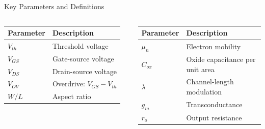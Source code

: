 \documentclass[10pt, aspectratio=169]{beamer}
\begin{document}
\begin{frame}{Key Parameters and Definitions}
    
    \begin{columns}[T]
    \begin{table}[t]
    \centering
    \renewcommand{\arraystretch}{1.8}
    \small
    \begin{tabular}{|l|p{4cm}|}
    \hline
    \textbf{Parameter} & \textbf{Description} \\
    \hline
    \hline
    $V_{th}$ & Threshold voltage \\
    \hline
    $V_{GS}$ & Gate-source voltage \\
    \hline
    $V_{DS}$ & Drain-source voltage \\
    \hline
    $V_{OV}$ & Overdrive: $V_{GS}-V_{th}$ \\
    \hline
    $W/L$ & Aspect ratio \\
    \hline
    \end{tabular}
    \end{table}
    
    \begin{table}[t]
    \centering
    \renewcommand{\arraystretch}{1.8}
    \small
    \begin{tabular}{|l|p{4cm}|}
    \hline
    \textbf{Parameter} & \textbf{Description} \\
    \hline
    \hline
    $\mu_n$ & Electron mobility \\
    \hline
    $C_{ox}$ & Oxide capacitance per unit area \\
    \hline
    $\lambda$ & Channel-length modulation \\
    \hline
    $g_m$ & Transconductance \\
    \hline
    $r_o$ & Output resistance \\
    \hline
    \end{tabular}
    \end{table}
    \end{columns}
    
\end{frame}
\end{document}
